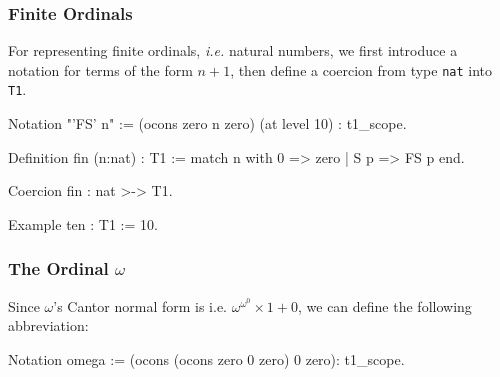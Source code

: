 \subsubsection{Finite Ordinals}
\label{sec:orgheadline67}

For representing finite ordinals, \emph{i.e.} natural numbers, we first introduce a notation for terms of the form $n+1$, then define a coercion from type \texttt{nat} into \texttt{T1}.
\label{sect:notation-FS}

\begin{Coqsrc}
Notation "'FS' n" :=
     (ocons zero n zero) (at level 10) : t1_scope.
\end{Coqsrc}

\label{sect:notation-F}

\begin{Coqsrc}
Definition fin (n:nat) : T1 := 
    match n with 0 => zero | S p => FS p end. 

Coercion fin  : nat >-> T1.

Example ten : T1 := 10.   
\end{Coqsrc}



\subsubsection{The Ordinal \(\omega\)}
\label{sec:orgheadline68}

  Since \(\omega\)'s Cantor normal form is
i.e. \(\omega^{\omega^0}\times 1+ 0\), we can define the following abbreviation:

\label{sect:omega-notation2}
\begin{Coqsrc}
Notation omega := (ocons (ocons zero 0 zero) 0 zero): t1_scope.
\end{Coqsrc}

